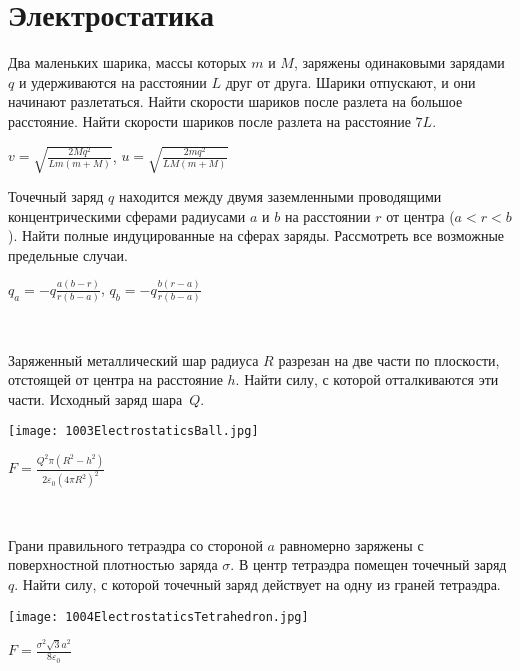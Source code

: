 \section{Электростатика}

\begin{ex}
Два маленьких шарика, массы которых $m$ и $M$, заряжены одинаковыми зарядами $q$ и удерживаются на расстоянии $L$ друг от друга. Шарики отпускают, и они начинают разлетаться. Найти скорости шариков после разлета на большое расстояние. Найти скорости шариков после разлета на расстояние $7L$.

\begin{ans}
$v = \sqrt{\frac{2Mq^2}{Lm(m+M)}}$, $u = \sqrt{\frac{2mq^2}{LM(m+M)}}$
\end{ans}
\end{ex}

\begin{ex}
Точечный заряд $q$ находится между двумя заземленными проводящими концентрическими сферами 
радиусами $a$ и $b$ на расстоянии $r$ от центра ($a<r<b$). 
Найти полные индуцированные на сферах заряды. Рассмотреть все возможные предельные случаи.

\begin{ans}
$q_a = -q\frac{a(b-r)}{r(b-a)}$, $q_b = -q\frac{b(r-a)}{r(b-a)}$
\end{ans}
\end{ex}

\begin{ex}
\hspace{0pt} \\
\begin{minipage}{.65\textwidth}
Заряженный металлический шар радиуса $R$ разрезан на две части по плоскости, отстоящей от центра на расстояние $h$. 
Найти силу, с которой отталкиваются эти части. Исходный заряд шара~$Q$.
\end{minipage}
\begin{minipage}{.35\textwidth}
\centering
\texttt{[image: 1003ElectrostaticsBall.jpg]}
\end{minipage}
\begin{ans}
$F = \frac{Q^2 \pi (R^2-h^2)}{2 \varepsilon_0 {(4 \pi R^2)}^2}$
\end{ans}
\end{ex}

\begin{ex}
\hspace{0pt} \\
\begin{minipage}{.65\textwidth}
Грани правильного тетраэдра со стороной $a$ равномерно заряжены с поверхностной плотностью заряда $\sigma$. 
В центр тетраэдра помещен точечный заряд $q$. Найти силу, с которой точечный заряд действует на одну из граней тетраэдра.
\end{minipage}
\begin{minipage}{.35\textwidth}
\centering
\texttt{[image: 1004ElectrostaticsTetrahedron.jpg]}
\end{minipage}
\begin{ans}
$F = \frac{\sigma^2 \sqrt{3}a^2}{8\varepsilon_0}$
\end{ans}
\end{ex}

